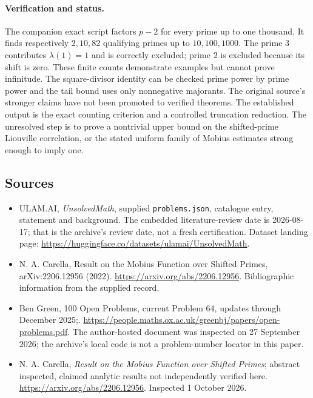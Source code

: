 \documentclass[11pt,a4paper]{article}
\begin{document}
\paragraph{Verification and status.}
The companion exact script factors $p-2$ for every prime up to one thousand. It finds respectively $2,10,82$ qualifying primes up to $10,100,1000$. The prime $3$ contributes $\lambda(1)=1$ and is correctly excluded; prime $2$ is excluded because its shift is zero. These finite counts demonstrate examples but cannot prove infinitude. The square-divisor identity can be checked prime power by prime power and the tail bound uses only nonnegative majorants. The original source's stronger claims have not been promoted to verified theorems. The established output is the exact counting criterion and a controlled truncation reduction. The unresolved step is to prove a nontrivial upper bound on the shifted-prime Liouville correlation, or the stated uniform family of Mobius estimates strong enough to imply one.

\subsection{Sources}

{\small

\begin{itemize}

\item[\hypertarget{source:statement:1}{S1}] ULAM.AI, \emph{UnsolvedMath}, supplied \texttt{problems.json}, catalogue entry, statement and background. The embedded literature-review date is 2026-08-17; that is the archive’s review date, not a fresh certification. Dataset landing page: \url{https://huggingface.co/datasets/ulamai/UnsolvedMath}.

\item[\hypertarget{source:statement:2}{S2}] N. A. Carella, Result on the Mobius Function over Shifted Primes, arXiv:2206.12956 (2022). \url{https://arxiv.org/abs/2206.12956}. Bibliographic information from the supplied record.

\item[\hypertarget{source:statement:3}{S3}] Ben Green, 100 Open Problems, current Problem 64, updates through December 2025;. \url{https://people.maths.ox.ac.uk/greenbj/papers/open-problems.pdf}. The author-hosted document was inspected on 27 September 2026; the archive’s local code is not a problem-number locator in this paper.

\item[E1] N. A. Carella, \emph{Result on the Mobius Function over Shifted Primes}; abstract inspected, claimed analytic results not independently verified here. \url{https://arxiv.org/abs/2206.12956}. Inspected 1 October 2026.

\end{itemize}

}

\label{end:statement}
\end{document}
